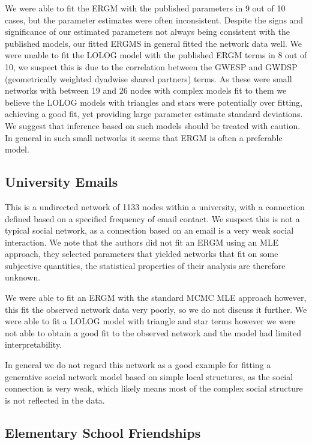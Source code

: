 \documentclass[
]{statsoc}
\begin{document}
We were able to fit the ERGM with the published parameters in 9 out of
10 cases, but the parameter estimates were often inconsistent. Despite
the signs and significance of our estimated parameters not always being
consistent with the published models, our fitted ERGMS in general fitted
the network data well. We were unable to fit the LOLOG model with the
published ERGM terms in 8 out of 10, we suspect this is due to the
correlation between the GWESP and GWDSP (geometrically weighted dyadwise
shared partners) terms. As these were small networks with between 19 and
26 nodes with complex models fit to them we believe the LOLOG models
with triangles and stars were potentially over fitting, achieving a good
fit, yet providing large parameter estimate standard deviations. We
suggest that inference based on such models should be treated with
caution. In general in such small networks it seems that ERGM is often a
preferable model.

\subsection{University Emails}

This is a undirected network of 1133 nodes within a university, with a
connection defined based on a specified frequency of email contact. We
suspect this is not a typical social network, as a connection based on
an email is a very weak social interaction. We note that the authors did
not fit an ERGM using an MLE approach, they selected parameters that
yielded networks that fit on some subjective quantities, the statistical
properties of their analysis are therefore unknown.

We were able to fit an ERGM with the standard MCMC MLE approach however,
this fit the observed network data very poorly, so we do not discuss it
further. We were able to fit a LOLOG model with triangle and star terms
however we were not able to obtain a good fit to the observed network
and the model had limited interpretability.

In general we do not regard this network as a good example for fitting a
generative social network model based on simple local structures, as the
social connection is very weak, which likely means most of the complex
social structure is not reflected in the data.

\subsection{Elementary School Friendships}
\end{document}
